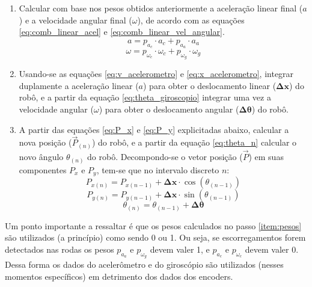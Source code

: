 \begin{enumerate}
  \item Calcular com base nos pesos obtidos anteriormente a aceleração linear final ($a$) e a velocidade angular final ($\omega$), de acordo com as equações \ref{eq:comb_linear_acel} e \ref{eq:comb_linear_vel_angular}.
  \begin{equation}
      a = p_{a_c} \cdot a_c + p_{a_a} \cdot a_a
      \label{eq:comb_linear_acel}
    \end{equation}
  \begin{equation}
      \omega = p_{\omega_c} \cdot \omega_c + p_{\omega_g} \cdot \omega_g
      \label{eq:comb_linear_vel_angular}
    \end{equation}    
  
  \item Usando-se as equações \ref{eq:v_acelerometro} e \ref{eq:x_acelerometro}, integrar duplamente a aceleração linear ($a$) para obter o deslocamento linear ($\bm{\Delta x}$) do robô, e a partir da equação \ref{eq:theta_giroscopio} integrar uma vez a velocidade angular ($\omega$) para obter o deslocamento angular ($\bm{\Delta \theta}$) do robô.
  
  \item A partir das equações \ref{eq:P_x} e \ref{eq:P_y} explicitadas abaixo, calcular a nova posição ($\overrightarrow{P}_{(n)}$) do robô, e a partir da equação \ref{eq:theta_n} calcular o novo ângulo $\theta_{(n)}$ do robô. Decompondo-se o vetor posição ($\overrightarrow{P}$) em suas componentes $P_x$ e $P_y$, tem-se que no intervalo discreto $n$:
    \begin{equation}
      P_{x (n)} = P_{x (n-1)} + \bm{\Delta x} \cdot \cos{(\theta_{(n-1)})}
      \label{eq:P_x}
    \end{equation}
    \begin{equation}
      P_{y (n)} = P_{y (n-1)} + \bm{\Delta x} \cdot \sin{(\theta_{(n-1)})}
      \label{eq:P_y}
    \end{equation}
    \begin{equation}
      \theta_{(n)} = \theta_{(n-1)} + \bm{\Delta \theta}
      \label{eq:theta_n}
    \end{equation}
\end{enumerate}

Um ponto importante a ressaltar é que os pesos calculados no passo \ref{item:pesos} são utilizados (a princípio) como sendo 0 ou 1. Ou seja, se escorregamentos forem detectados nas rodas os pesos $p_{a_a}$ e $p_{\omega_g}$ devem valer 1, e $p_{a_c}$ e $p_{\omega_c}$ devem valer 0. Dessa forma os dados do acelerômetro e do giroscópio são utilizados (nesses momentos específicos) em detrimento dos dados dos encoders.


